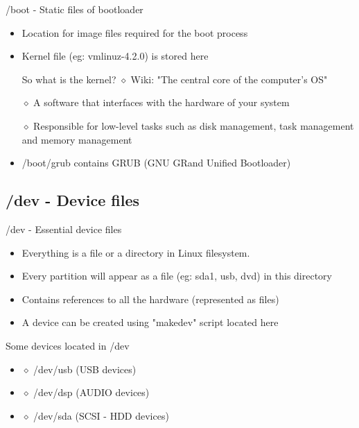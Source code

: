 \documentclass{beamer}
\begin{document}
\begin{frame}{/boot - Static files of bootloader}

\begin{itemize}
\setlength\itemsep{0.8em}
\item <1-> Location for image files required for the boot process
\item <2-> Kernel file (eg: vmlinuz-4.2.0) is stored here
\begin{block}{So what is the kernel?}
$\diamond$ Wiki: "The central core of the computer's OS"

\vspace{0.2cm}
$\diamond$ A software that interfaces with the hardware of your system

\vspace{0.2cm}
$\diamond$ Responsible for low-level tasks such as disk management, task management and memory management
\end{block}
\item <3-> /boot/grub contains GRUB (GNU GRand Unified Bootloader) 
\end{itemize}
\end{frame}

\subsection{/dev - Device files}
\begin{frame}{/dev - Essential device files}

\begin{itemize}
\setlength\itemsep{0.8em}
\item <1-> Everything is a file or a directory in Linux filesystem.
\item <2-> Every partition will appear as a file (eg: sda1, usb, dvd) in this directory
\item <3-> Contains references to all the hardware (represented as files) 
\item <4-> A device can be created using "makedev" script located here
\end{itemize}
\pause
\begin{block}{Some devices located in /dev}
\begin{itemize}
\item[] $\diamond$ /dev/usb (USB devices)
\item[] $\diamond$ /dev/dsp (AUDIO devices)
\item[] $\diamond$ /dev/sda (SCSI - HDD devices)
\end{itemize}
\end{block}
\end{frame}
\end{document}
